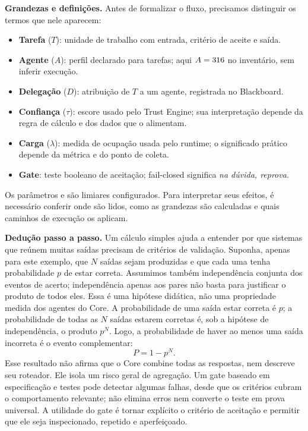 \begin{definicao}
\textbf{Grandezas e definições.} Antes de formalizar o fluxo, precisamos distinguir
os termos que nele aparecem:
\begin{itemize}[leftmargin=1.3em,itemsep=1pt]
  \item \textbf{Tarefa} ($T$): unidade de trabalho com entrada, critério de aceite e saída.
  \item \textbf{Agente} ($A$): perfil declarado para tarefas; aqui $A = 316$ no inventário, sem inferir execução.
  \item \textbf{Delegação} ($D$): atribuição de $T$ a um agente, registrada no Blackboard.
  \item \textbf{Confiança} ($\tau$): escore usado pelo Trust Engine; sua interpretação depende da regra de cálculo e dos dados que o alimentam.
  \item \textbf{Carga} ($\lambda$): medida de ocupação usada pelo runtime; o significado prático depende da métrica e do ponto de coleta.
  \item \textbf{Gate}: teste booleano de aceitação; fail-closed significa \emph{na dúvida, reprova}.
\end{itemize}
Os parâmetros  e  são
limiares configurados. Para interpretar seus efeitos, é necessário conferir onde
são lidos, como as grandezas são calculadas e quais caminhos de execução os
aplicam.
\end{definicao}

\begin{metodo}
\textbf{Dedução passo a passo.} Um cálculo simples ajuda a entender por que sistemas
que reúnem muitas saídas precisam de critérios de validação. Suponha, apenas para
este exemplo, que $N$ saídas sejam produzidas e que cada uma tenha probabilidade
$p$ de estar correta. Assumimos também independência conjunta dos eventos de acerto; independência apenas aos pares não basta para justificar o produto de todos eles. Essa é uma hipótese didática, não uma propriedade medida dos agentes do Core. A
probabilidade de uma saída estar correta é $p$; a probabilidade de todas as $N$
saídas estarem corretas é, sob a hipótese de independência, o produto $p^N$. Logo,
a probabilidade de haver ao menos uma saída incorreta é o evento complementar:
\[ P = 1 - p^{N}. \]
Esse resultado não afirma que o Core combine todas as respostas, nem descreve seu
roteador. Ele isola um risco geral de agregação. Um gate baseado em especificação e
testes pode detectar algumas falhas, desde que os critérios cubram o comportamento
relevante; não elimina erros nem converte o teste em prova universal. A utilidade
do gate é tornar explícito o critério de aceitação e permitir que ele seja
inspecionado, repetido e aperfeiçoado.
\end{metodo}

